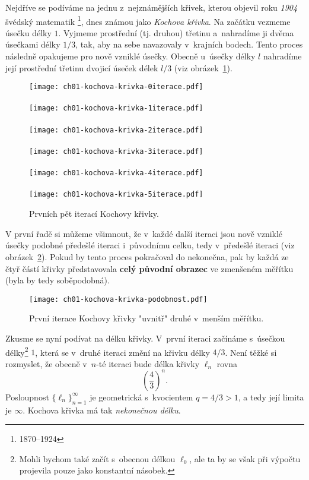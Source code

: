 Nejdříve se podíváme na jednu z~nejznámějších křivek, kterou objevil roku \emph{1904} švédský matematik \footnote{1870--1924}, dnes známou jako \emph{Kochova křivka}. \citep[str. 61]{Peitgen2004} Na začátku vezmeme úsečku délky $1$. Vyjmeme prostřední (tj. druhou) třetinu a~nahradíme ji dvěma úsečkami délky $1/3$, tak, aby na sebe navazovaly v~krajních bodech. Tento proces následně opakujeme pro nově vzniklé úsečky. Obecně u~úsečky délky $l$ nahradíme její prostřední třetinu dvojicí úseček délek $l/3$ (viz obrázek~\ref{fig:kochova_vlocka_5iteraci}).
\begin{figure}[h]
    \centering
    \texttt{[image: ch01-kochova-krivka-0iterace.pdf]}\\\qquad\\
    \texttt{[image: ch01-kochova-krivka-1iterace.pdf]}\\\qquad\\
    \texttt{[image: ch01-kochova-krivka-2iterace.pdf]}\\\qquad\\
    \texttt{[image: ch01-kochova-krivka-3iterace.pdf]}\\\qquad\\
    \texttt{[image: ch01-kochova-krivka-4iterace.pdf]}\\\qquad\\
    \texttt{[image: ch01-kochova-krivka-5iterace.pdf]}
    \caption{Prvních pět iterací Kochovy křivky.}
    \label{fig:kochova_vlocka_5iteraci}
\end{figure}
V první řadě si můžeme všimnout, že v~každé další iteraci jsou nově vzniklé úsečky podobné předešlé iteraci i~původnímu celku, tedy v~předešlé iteraci (viz obrázek~\ref{fig:kochova_krivka_podobnost}). Pokud by tento proces pokračoval do nekonečna, pak by každá ze čtyř částí křivky představovala \textbf{celý původní obrazec} ve zmenšeném měřítku (byla by tedy soběpodobná).
\begin{figure}[h]
    \centering
    \texttt{[image: ch01-kochova-krivka-podobnost.pdf]}
    \caption{První iterace Kochovy křivky "uvnitř" druhé v~menším měřítku.}
    \label{fig:kochova_krivka_podobnost}
\end{figure}
Zkusme se nyní podívat na délku křivky. V~první iteraci začínáme s~úsečkou délky\footnote{Mohli bychom také začít s~obecnou délkou $\ell_0$, ale ta by se však při výpočtu projevila pouze jako konstantní násobek.} $1$, která se v~druhé iteraci změní na křivku délky $4/3$. Není těžké si rozmyslet, že obecně v~$n$-té iteraci bude délka křivky $\ell_n$ rovna
\begin{equation*}
    \left(\dfrac{4}{3}\right)^{n}.
\end{equation*}
Posloupnost $\{\ell_n\}_{n=1}^{\infty}$ je geometrická s~kvocientem $q=4/3>1$, a tedy její limita je $\infty$. Kochova křivka má tak \emph{nekonečnou délku}.

